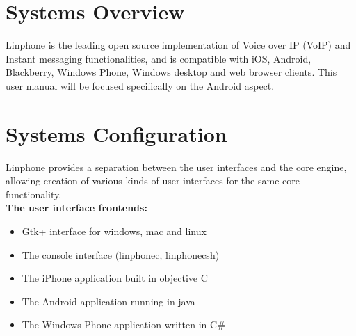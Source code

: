 \documentclass[11pt]{article}
\begin{document}
%

\newpage
\section{Systems Overview}
Linphone is the leading open source implementation of Voice over IP (VoIP) and Instant messaging functionalities, and is compatible with iOS, Android, Blackberry, Windows Phone, Windows desktop and web browser clients. This user manual will be focused specifically on the Android aspect. 

\section{Systems Configuration}
Linphone provides a separation between the user interfaces and the core engine, allowing creation of various kinds of user interfaces for the same core functionality.\\

\textbf{The user interface frontends:}
\begin{itemize}
\item Gtk+ interface for windows, mac and linux
\item The console interface (linphonec, linphonecsh)
\item The iPhone application built in objective C
\item The Android application running in java
\item The Windows Phone application written in C\#
\end{itemize}
\end{document}
